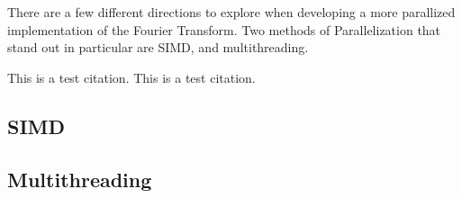 \documentclass[12pt]{extarticle}
\begin{document}
    There are a few different directions to explore when developing a more
    parallized implementation of the Fourier Transform. Two methods of Parallelization
    that stand out in particular are SIMD, and multithreading.
    
    This is a test citation. \cite{knuth:1984}
    This is a test citation. \cite{Liu:2021}

\subsection*{SIMD} 


\subsection*{Multithreading} 


\end{document}
